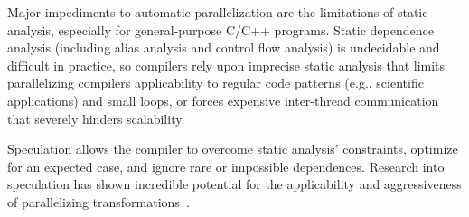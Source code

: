 Major impediments to automatic parallelization are the limitations of static
analysis, especially for general-purpose C/C++ programs. Static dependence
analysis (including alias analysis and control flow analysis) is undecidable and
difficult in practice, so compilers rely upon imprecise static analysis that
limits parallelizing compilers applicability to regular code patterns (e.g.,
scientific applications) and small loops, or forces expensive inter-thread
communication that severely hinders scalability.
%
%

%
%

Speculation allows the compiler to overcome static analysis' constraints,
optimize for an expected
case, and ignore rare or impossible dependences.  Research into speculation has
shown incredible potential for the applicability and aggressiveness of
parallelizing transformations~\cite{zhong:08:hpca, johnson:12:pldi:short}.
%

